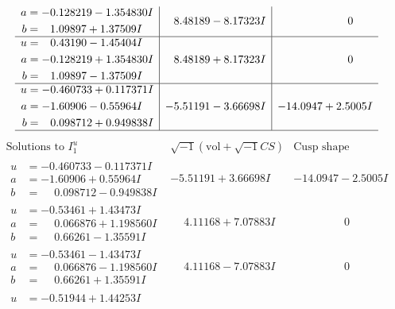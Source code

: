 \documentclass[1p]{elsarticle_modified}
\theoremstyle{definition}
\newcommand{\I}{\sqrt{-1}}
\begin{document}
$$\begin{array}{c|c|c}
\begin{aligned}
a &= -0.128219 - 1.354830 I \\
b &= \phantom{-}1.09897 + 1.37509 I\end{aligned}
 & \phantom{-}8.48189 - 8.17323 I & \phantom{-0.000000 } 0 \\ \hline\begin{aligned}
u &= \phantom{-}0.43190 - 1.45404 I \\
a &= -0.128219 + 1.354830 I \\
b &= \phantom{-}1.09897 - 1.37509 I\end{aligned}
 & \phantom{-}8.48189 + 8.17323 I & \phantom{-0.000000 } 0 \\ \hline\begin{aligned}
u &= -0.460733 + 0.117371 I \\
a &= -1.60906 - 0.55964 I \\
b &= \phantom{-}0.098712 + 0.949838 I\end{aligned}
 & -5.51191 - 3.66698 I & -14.0947 + 2.5005 I\\
 \hline 
 \end{array}$$\newpage$$\begin{array}{c|c|c}  
\text{Solutions to }I^u_{1}& \I (\text{vol} + \sqrt{-1}CS) & \text{Cusp shape}\\
 \hline 
\begin{aligned}
u &= -0.460733 - 0.117371 I \\
a &= -1.60906 + 0.55964 I \\
b &= \phantom{-}0.098712 - 0.949838 I\end{aligned}
 & -5.51191 + 3.66698 I & -14.0947 - 2.5005 I \\ \hline\begin{aligned}
u &= -0.53461 + 1.43473 I \\
a &= \phantom{-}0.066876 + 1.198560 I \\
b &= \phantom{-}0.66261 - 1.35591 I\end{aligned}
 & \phantom{-}4.11168 + 7.07883 I & \phantom{-0.000000 } 0 \\ \hline\begin{aligned}
u &= -0.53461 - 1.43473 I \\
a &= \phantom{-}0.066876 - 1.198560 I \\
b &= \phantom{-}0.66261 + 1.35591 I\end{aligned}
 & \phantom{-}4.11168 - 7.07883 I & \phantom{-0.000000 } 0 \\ \hline\begin{aligned}
u &= -0.51944 + 1.44253 I \\

\end{aligned}
\end{array}$$
\end{document}
